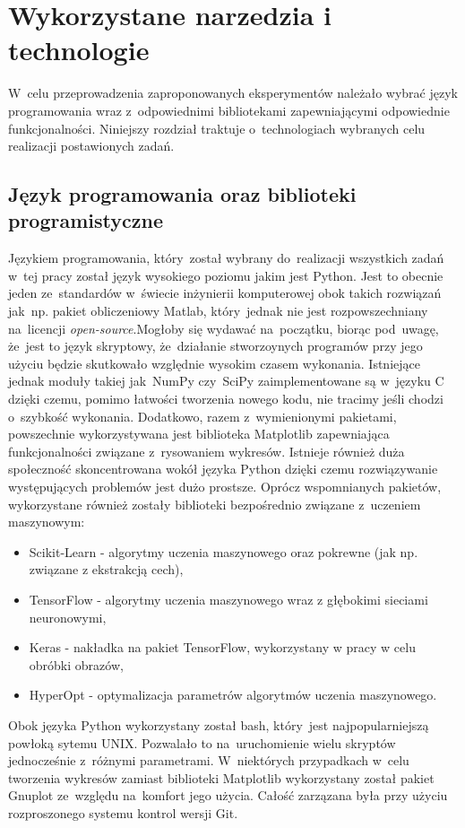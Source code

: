 \section{Wykorzystane narzedzia i technologie} \label{tools}
W~celu przeprowadzenia zaproponowanych eksperymentów należało wybrać język programowania wraz z~odpowiednimi bibliotekami zapewniającymi odpowiednie funkcjonalności. Niniejszy rozdział traktuje o~technologiach wybranych celu realizacji postawionych zadań.
\subsection{Język programowania oraz biblioteki programistyczne}
Językiem programowania, który~został wybrany do~realizacji wszystkich zadań w~tej pracy został język wysokiego poziomu jakim jest Python. Jest to obecnie jeden ze~standardów w~świecie inżynierii komputerowej obok takich rozwiązań jak~np. pakiet obliczeniowy Matlab, który~jednak nie jest rozpowszechniany na~licencji \textit{open-source}.Mogłoby się wydawać na~początku, biorąc pod~uwagę, że~jest to język skryptowy, że~działanie stworzoynych programów przy jego użyciu będzie skutkowało względnie wysokim czasem wykonania. Istniejące jednak moduły takiej jak~NumPy czy~SciPy\cite{scipy} zaimplementowane są w~języku C dzięki czemu, pomimo łatwości tworzenia nowego kodu, nie tracimy jeśli chodzi o~szybkość wykonania. Dodatkowo, razem z~wymienionymi pakietami, powszechnie wykorzystywana jest biblioteka Matplotlib\cite{matplotlib} zapewniająca funkcjonalności związane z~rysowaniem wykresów. Istnieje również duża społeczność skoncentrowana wokół języka Python dzięki czemu rozwiązywanie występujących problemów jest dużo prostsze. Oprócz wspomnianych pakietów, wykorzystane również zostały biblioteki bezpośrednio związane z~uczeniem maszynowym:
\begin{itemize}
\item Scikit-Learn\cite{scikit} - algorytmy uczenia maszynowego oraz pokrewne (jak np. związane z ekstrakcją cech),
\item TensorFlow\cite{tensorflow} - algorytmy uczenia maszynowego wraz z głębokimi sieciami neuronowymi,
\item Keras\cite{keras} - nakładka na pakiet TensorFlow, wykorzystany w pracy w celu obróbki obrazów,
\item HyperOpt\cite{hyperopt} - optymalizacja parametrów algorytmów uczenia maszynowego.
\end{itemize}
Obok języka Python wykorzystany został bash, który~jest najpopularniejszą powłoką sytemu UNIX. Pozwalało to na~uruchomienie wielu skryptów jednocześnie z~różnymi parametrami. W~niektórych przypadkach w~celu tworzenia wykresów zamiast biblioteki Matplotlib wykorzystany został pakiet Gnuplot ze~względu na~komfort jego użycia. Całość zarzązana była przy użyciu rozproszonego systemu kontrol wersji Git.

